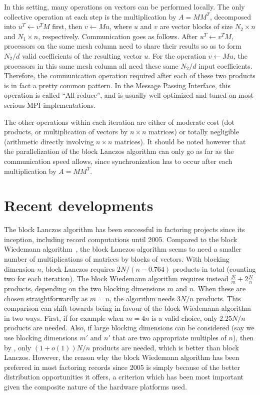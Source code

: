 In this setting, many operations on vectors can be performed locally.  The
only collective operation at each step is the multiplication by $A=MM^T$,
decomposed into $u^T \leftarrow v^T M$ first, then $v \leftarrow M u$, where
$u$ and $v$ are vector blocks of size $N_2\times n$ and $N_1\times n$,
respectively. Communication goes as follows. After $u^T \leftarrow v^T M$,
processors on the same mesh column need to share their results so as to
form $N_2/d$ valid coefficients of the resulting vector $u$. For the
operation $v \leftarrow M u$, the processors in this same mesh column all
need these same $N_2/d$ input coefficients. Therefore, the communication 
operation required after each of these two products is in fact a pretty
common pattern. In the Message Passing Interface, this operation is called
``All-reduce'', and is usually well optimized and tuned on most serious
MPI implementations.

The other operations within each iteration are either of moderate cost (dot
products, or multiplication of vectors by $n\times n$ matrices) or totally
negligible (arithmetic directly involving $n\times n$ matrices). It should
be noted however that the parallelization of the block Lanczos algorithm
can only go as far as the communication speed allows, since synchronization
has to occur after each multiplication by $A=MM^T$.

\section{Recent developments}
\label{sec:blocklanczos:recent}

The block Lanczos algorithm has been successful in factoring projects since
its inception, including record computations until 2005. Compared to the
block Wiedemann algorithm~\cite{Coppersmith94}, the block Lanczos algorithm
seems to need a smaller number of multiplications of matrices by blocks of vectors.
With blocking dimension $n$, block Lanczos requires $2N/(n-0.764)$ products
in total (counting two for each iteration). The block Wiedemann algorithm
requires instead $\frac Nm+2\frac Nn$ products, depending on the two
blocking dimensions $m$ and $n$. When these are
chosen
straightforwardly as $m=n$, the algorithm needs $3N/n$ products. This
comparison can shift towards
being in favour of the block Wiedemann algorithm in two ways. First,
if for example when $m=4n$ is a valid choice, only $2.25N/n$
products are needed. Also, if large blocking dimensions can be considered
(say we use blocking dimensions $m'$ and $n'$ that are two appropriate multiples of $n$), then by
\cite[Theorem 7]{Kaltofen95}, only $(1+o(1))N/n$ products are needed,
which is better than block Lanczos.
However, the reason why the block Wiedemann algorithm has been
preferred in most factoring records since 2005 is simply because of the better
distribution opportunities it offers, a criterion which has been most
important given the composite nature of the hardware platforms used.

